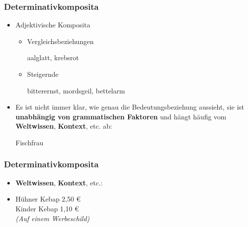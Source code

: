 \begin{frame}
\frametitle{Determinativkomposita}

\begin{itemize}
	\item Adjektivische Komposita
	
	\begin{itemize}
		\item Vergleichsbeziehungen
		
		\ea aalglatt, krebsrot
		\z
		
		\item Steigernde
		
		\ea bitterernst, mordsgeil, bettelarm
		\z
		
	\end{itemize}
	
	\item Es ist nicht immer klar, wie genau die Bedeutungsbeziehung aussieht, sie ist \textbf{unabhängig von grammatischen Faktoren} und hängt häufig vom \textbf{Weltwissen}, \textbf{Kontext}, etc. ab:
	
	\ea Fischfrau
	\z
	
\end{itemize}


\end{frame}


\begin{frame}
\frametitle{Determinativkomposita}

\begin{itemize}
	\item \textbf{Weltwissen}, \textbf{Kontext}, etc.:
	\item[] Hühner Kebap 2,50 €\\
	Kinder Kebap 1,10 €\\
	\emph{(Auf einem Werbeschild)}
\end{itemize}


\end{frame}




